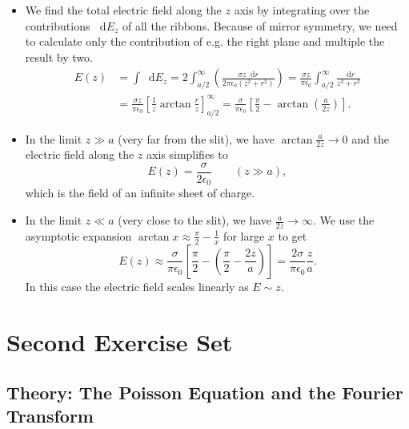 \documentclass[11pt, a4paper]{article}
\newcommand{\diff}{\mathop{}\!\mathrm{d}} %
\newcommand{\ee}{\epsilon_{0}}  %
\begin{document}
\begin{itemize}
	\item We find the total electric field along the $ z $ axis by integrating over the contributions $ \diff E_{z} $ of all the ribbons. Because of mirror symmetry, we need to calculate only the contribution of e.g. the right plane and multiple the result by two.
	\begin{align*}
		E(z) &= \int \diff E_{z} = 2 \int_{a/2}^{\infty} \left(\frac{\sigma z \diff r}{2\pi \ee (z^{2} + r^{2})}\right) = \frac{\sigma z}{\pi \ee} \int_{a/2}^{\infty} \frac{\diff r}{z^{2} + r^{2}}\\
		&= \frac{\sigma z}{\pi \ee} \left[\frac{1}{z}\arctan \frac{r}{z}\right]_{a/2}^{\infty} = \frac{\sigma}{\pi \ee} \left[\frac{\pi}{2} - \arctan(\frac{a}{2z})\right].
	\end{align*}
	
	\item In the limit $ z \gg a $ (very far from the slit), we have $ \arctan\frac{a}{2z} \to 0 $ and the electric field along the $ z $ axis simplifies to 
	\begin{equation*}
		E(z) = \frac{\sigma}{2 \ee} \qquad (z \gg a),
	\end{equation*}
	which is the field of an infinite sheet of charge.
	
	\item In the limit $ z \ll a $ (very close to the slit), we have $ \frac{a}{2z} \to \infty $. We use the asymptotic expansion $ \arctan x \approx \frac{\pi}{2} - \frac{1}{x} $ for large $ x $ to get
	\begin{equation*}
		E(z) \approx \frac{\sigma}{\pi \ee} \left[\frac{\pi}{2} - \left(\frac{\pi}{2} - \frac{2z}{a}\right)\right] = \frac{2\sigma}{\pi \ee} \frac{z}{a}.
	\end{equation*}
	In this case the electric field scales linearly as $ E \sim z $. 
\end{itemize} 


\section{Second Exercise Set}
\subsection{Theory: The Poisson Equation and the Fourier Transform}
\end{document}
